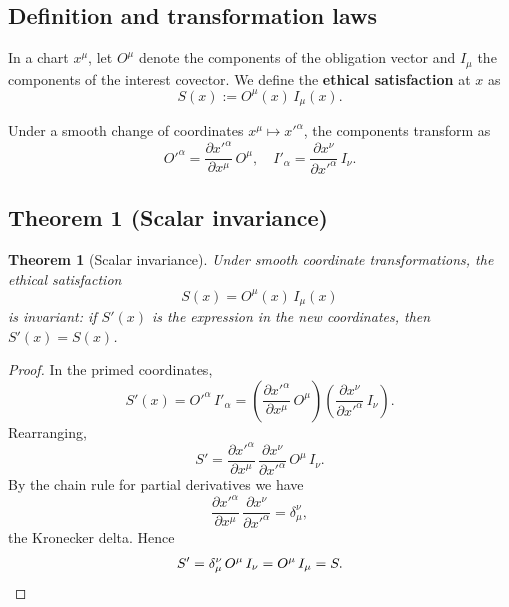 \documentclass[12pt]{article}
\newtheorem{theorem}{Theorem}
\theoremstyle{remark}
\begin{document}
\subsection{Definition and transformation laws}

In a chart $x^\mu$, let $O^\mu$ denote the components of the obligation vector and $I_\mu$ the components of the interest covector. We define the \textbf{ethical satisfaction} at $x$ as
\begin{equation}
    S(x) := O^\mu(x)\, I_\mu(x).
\end{equation}

Under a smooth change of coordinates $x^\mu \mapsto x'^\alpha$, the components transform as
\begin{equation}
    O'^{\alpha} = \frac{\partial x'^{\alpha}}{\partial x^{\mu}}\, O^{\mu},\quad
    I'_{\alpha} = \frac{\partial x^{\nu}}{\partial x'^{\alpha}}\, I_{\nu}.
\end{equation}

\subsection{Theorem 1 (Scalar invariance)}

\begin{theorem}[Scalar invariance]
Under smooth coordinate transformations, the ethical satisfaction
\begin{equation}
    S(x) = O^\mu(x)\, I_\mu(x)
\end{equation}
is invariant: if $S'(x)$ is the expression in the new coordinates, then $S'(x) = S(x)$.
\end{theorem}

\begin{proof}
In the primed coordinates,
\begin{equation}
    S'(x) = O'^{\alpha}\, I'_{\alpha}
    = \left(\frac{\partial x'^{\alpha}}{\partial x^{\mu}}\, O^{\mu}\right)
      \left(\frac{\partial x^{\nu}}{\partial x'^{\alpha}}\, I_{\nu}\right).
\end{equation}
Rearranging,
\begin{equation}
    S' = \frac{\partial x'^{\alpha}}{\partial x^{\mu}}\,
         \frac{\partial x^{\nu}}{\partial x'^{\alpha}}\,
         O^{\mu}\, I_{\nu}.
\end{equation}
By the chain rule for partial derivatives we have
\begin{equation}
    \frac{\partial x'^{\alpha}}{\partial x^{\mu}}\,
    \frac{\partial x^{\nu}}{\partial x'^{\alpha}} = \delta^{\nu}_{\mu},
\end{equation}
the Kronecker delta. Hence
\begin{equation}
    S' = \delta^{\nu}_{\mu}\, O^{\mu}\, I_{\nu} = O^{\mu}\, I_{\mu} = S.
    \qedhere
\end{equation}
\end{proof}
\end{document}
